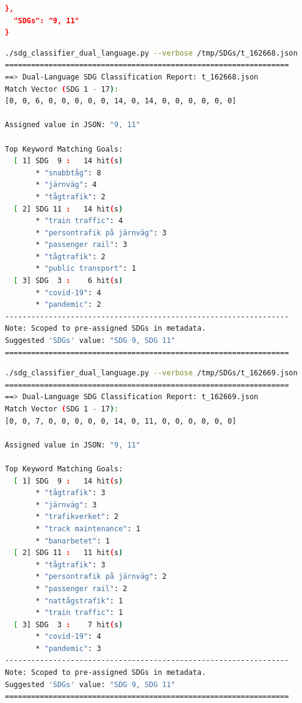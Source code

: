 \begin{casestudySection}
\begin{lstlisting}[language={json}, caption={t\_162669.json (manually reformatted to keep only one abstract in each language)}, label=lst:t_162669.json]
  },
  "SDGs": "9, 11"
}
\end{lstlisting}
\begin{lstlisting}[language={bash}, basicstyle=\footnotesize, escapechar=|, breaklines=true,
    postbreak=\usebox{\lstbreakbox}, caption={Program's output}, label=lst:t_162668Output]
 ./sdg_classifier_dual_language.py --verbose /tmp/SDGs/t_162668.json
=================================================================
==> Dual-Language SDG Classification Report: t_162668.json
Match Vector (SDG 1 - 17):
[0, 0, 6, 0, 0, 0, 0, 0, 14, 0, 14, 0, 0, 0, 0, 0, 0]

Assigned value in JSON: "9, 11"

Top Keyword Matching Goals:
  [ 1] SDG  9 :   14 hit(s)
       * "snabbtåg": 8
       * "järnväg": 4
       * "tågtrafik": 2
  [ 2] SDG 11 :   14 hit(s)
       * "train traffic": 4
       * "persontrafik på järnväg": 3
       * "passenger rail": 3
       * "tågtrafik": 2
       * "public transport": 1
  [ 3] SDG  3 :    6 hit(s)
       * "covid-19": 4
       * "pandemic": 2
-----------------------------------------------------------------
Note: Scoped to pre-assigned SDGs in metadata.
Suggested 'SDGs' value: "SDG 9, SDG 11"
=================================================================
\end{lstlisting}
\begin{lstlisting}[language={bash}, basicstyle=\footnotesize, escapechar=|, breaklines=true,
    postbreak=\usebox{\lstbreakbox}, caption={Program's output}, label=lst:t_162669Output]
./sdg_classifier_dual_language.py --verbose /tmp/SDGs/t_162669.json
=================================================================
==> Dual-Language SDG Classification Report: t_162669.json
Match Vector (SDG 1 - 17):
[0, 0, 7, 0, 0, 0, 0, 0, 14, 0, 11, 0, 0, 0, 0, 0, 0]

Assigned value in JSON: "9, 11"

Top Keyword Matching Goals:
  [ 1] SDG  9 :   14 hit(s)
       * "tågtrafik": 3
       * "järnväg": 3
       * "trafikverket": 2
       * "track maintenance": 1
       * "banarbetet": 1
  [ 2] SDG 11 :   11 hit(s)
       * "tågtrafik": 3
       * "persontrafik på järnväg": 2
       * "passenger rail": 2
       * "nattågstrafik": 1
       * "train traffic": 1
  [ 3] SDG  3 :    7 hit(s)
       * "covid-19": 4
       * "pandemic": 3
-----------------------------------------------------------------
Note: Scoped to pre-assigned SDGs in metadata.
Suggested 'SDGs' value: "SDG 9, SDG 11"
=================================================================
\end{lstlisting}


\end{casestudySection}
